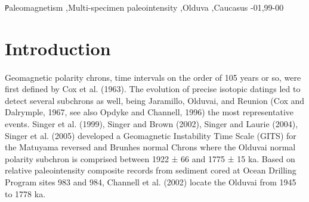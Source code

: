 \documentclass[review]{elsarticle}
\begin{document}
\begin{frontmatter}
\begin{keyword}
\texttt Paleomagnetism \sep Multi-specimen paleointensity \sep Olduva \sep Caucasus
-01\sep  99-00
\end{keyword}

\end{frontmatter}

\linenumbers
\section{Introduction}

\paragraph {} Geomagnetic polarity chrons, time intervals on the order of 105 years
or so, were first defined by Cox et al. (1963). The evolution of precise
isotopic datings led to detect several subchrons as well, being Jaramillo,
Olduvai, and Reunion (Cox and Dalrymple, 1967, see also Opdyke and
Channell, 1996) the most representative events. Singer et al. (1999),
Singer and Brown (2002), Singer and Laurie (2004), Singer et al. (2005)
developed a Geomagnetic Instability Time Scale (GITS) for the
Matuyama reversed and Brunhes normal Chrons where the Olduvai
normal polarity subchron is comprised between 1922 ± 66 and 1775 ±
15 ka. Based on relative paleointensity composite records from sediment
cored at Ocean Drilling Program sites 983 and 984, Channell et al.
(2002) locate the Olduvai from 1945 to 1778 ka.
\end{document}
